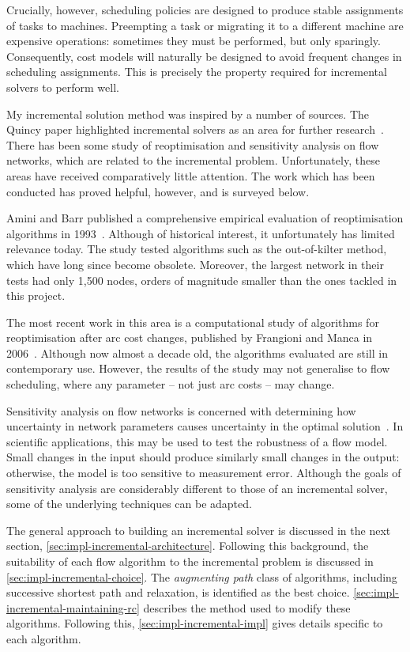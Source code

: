 Crucially, however, scheduling policies are designed to produce stable assignments of tasks to machines. Preempting a task or migrating it to a different machine are expensive operations: sometimes they must be performed, but only sparingly. Consequently, cost models will naturally be designed to avoid frequent changes in scheduling assignments. This is precisely the property required for incremental solvers to perform well.

My incremental solution method was inspired by a number of sources. The Quincy paper highlighted incremental solvers as an area for further research~\cite[\S6.5]{Isard:2007}. There has been some study of reoptimisation and sensitivity analysis on flow networks, which are related to the incremental problem. Unfortunately, these areas have received comparatively little attention. The work which has been conducted has proved helpful, however, and is surveyed below.

Amini and Barr published a comprehensive empirical evaluation of reoptimisation algorithms in 1993~\cite{Amini:1993}. Although of historical interest, it unfortunately has limited relevance today. The study tested algorithms such as the out-of-kilter method, which have long since become obsolete. Moreover, the largest network in their tests had only 1,500 nodes, orders of magnitude smaller than the ones tackled in this project. 

The most recent work in this area is a computational study of algorithms for reoptimisation after arc cost changes, published by Frangioni and Manca in 2006~\cite{Frangioni:2006}. Although now almost a decade old, the algorithms evaluated are still in contemporary use. However, the results of the study may not generalise to flow scheduling, where any parameter -- not just arc costs -- may change. 

Sensitivity analysis on flow networks is concerned with determining how uncertainty in network parameters causes uncertainty in the optimal solution~\cite[\S9.11]{Ahuja:1993}. In scientific applications, this may be used to test the robustness of a flow model. Small changes in the input should produce similarly small changes in the output: otherwise, the model is too sensitive to measurement error. Although the goals of sensitivity analysis are considerably different to those of an incremental solver, some of the underlying techniques can be adapted.

The general approach to building an incremental solver is discussed in the next section, \cref{sec:impl-incremental-architecture}. Following this background, the suitability of each flow algorithm to the incremental problem is discussed in \cref{sec:impl-incremental-choice}. The \emph{augmenting path} class of algorithms, including successive shortest path and relaxation, is identified as the best choice. \cref{sec:impl-incremental-maintaining-rc} describes the method used to modify these algorithms. Following this, \cref{sec:impl-incremental-impl} gives details specific to each algorithm.

